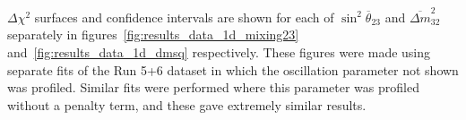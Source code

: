

$\Delta \chi^{2}$ surfaces and confidence intervals are shown for each of $\sin^2 \overline{\theta}_{23}$ 
and $\overline{\Delta m}^{2}_{32}$ separately in figures~\ref{fig:results_data_1d_mixing23}
and~\ref{fig:results_data_1d_dmsq} respectively. These figures were made using separate fits of the Run 
5+6 dataset in which the oscillation parameter not shown was profiled.
Similar fits were performed where this parameter was profiled without a penalty term, and these
gave extremely similar results.


